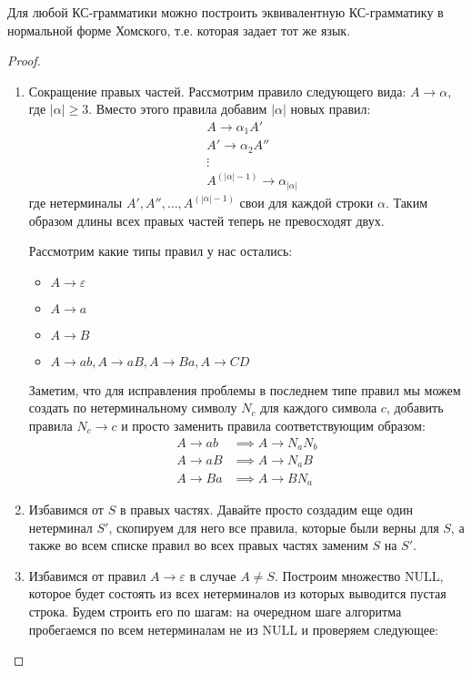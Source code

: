\begin{theorem}
  Для любой КС-грамматики можно построить эквивалентную КС-грамматику в нормальной форме Хомского, т.е. которая задает тот же язык.
\end{theorem}
\begin{proof} \quad

  \begin{enumerate}
    \item Сокращение правых частей. Рассмотрим правило следующего вида: $A \to \alpha$, где $|\alpha| \geq 3$. Вместо этого правила добавим $|\alpha|$ новых правил:
    \begin{align*}
      &A \to \alpha_1 A' \\
      &A' \to \alpha_2 A'' \\
      & \vdots \\
      &A^{(|\alpha| - 1)} \to \alpha_{|\alpha|}
    \end{align*}
    где нетерминалы $A', A'', \dotsc, A^{(|\alpha| - 1)}$ свои для каждой строки $\alpha$. Таким образом длины всех правых частей теперь не превосходят двух.
    
    Рассмотрим какие типы правил у нас остались:
    \begin{itemize}
      \item $A \to \varepsilon$
      \item $A \to a$
      \item $A \to B$
      \item $A \to ab, A \to aB, A \to Ba, A \to CD$
    \end{itemize}
    Заметим, что для исправления проблемы в последнем типе правил мы можем создать по нетерминальному символу $N_c$ для каждого символа $c$, добавить правила $N_c \to c$ и просто заменить правила соответствующим образом:
    \begin{align*}
      A \to ab &\implies A \to N_a N_b \\
      A \to aB &\implies A \to N_a B \\
      A \to Ba &\implies A \to B N_a
    \end{align*}

    \item Избавимся от $S$ в правых частях. Давайте просто создадим еще один нетерминал $S'$, скопируем для него все правила, которые были верны для $S$, а также во всем списке правил во всех правых частях заменим $S$ на $S'$.
    
    \item Избавимся от правил $A \to \varepsilon$ в случае $A \neq S$. Построим множество $\mathrm{NULL}$, которое будет состоять из всех нетерминалов из которых выводится пустая строка. Будем строить его по шагам: на очередном шаге алгоритма пробегаемся по всем нетерминалам не из $\mathrm{NULL}$ и проверяем следующее:


\end{enumerate}
\end{proof}
